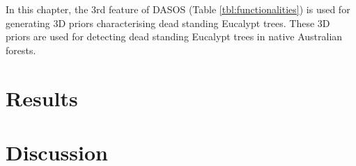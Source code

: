 \documentclass{subfiles}
\begin{document}
\par In this chapter, the 3rd feature of DASOS (Table \ref{tbl:functionalities}) is used for generating 3D priors characterising dead standing Eucalypt trees. These 3D priors are used for detecting dead standing Eucalypt trees in native Australian forests. 

\section{Results} 

		
		
\section{Discussion}
\end{document}
